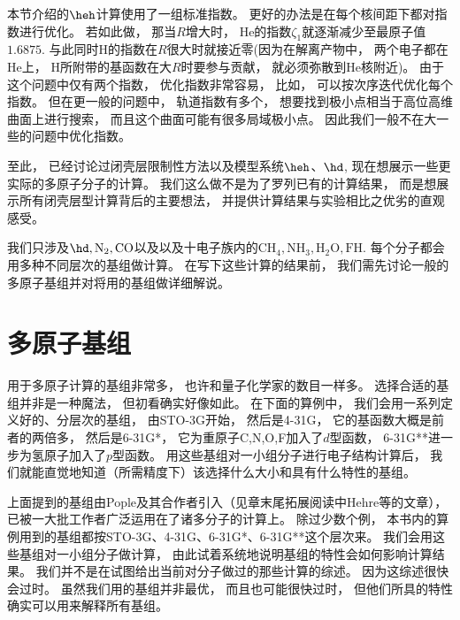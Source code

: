 
本节介绍的$\heh$计算使用了一组标准指数。
更好的办法是在每个核间距下都对指数进行优化。
若如此做，
那当$R$增大时，
$\text{He}$的指数$\zeta_1$就逐渐减少至最原子值$1.6875$. 
与此同时$\text{H}$的指数在$R$很大时就接近零(因为在解离产物中，
两个电子都在$\text{He}$上，
$\text{H}$所附带的基函数在大$R$时要参与贡献，
就必须弥散到$\text{He}$核附近)。
由于这个问题中仅有两个指数，
优化指数非常容易，
比如，
可以按次序迭代优化每个指数。
但在更一般的问题中，
轨道指数有多个，
想要找到极小点相当于高位高维曲面上进行搜索，
而且这个曲面可能有很多局域极小点。
因此我们一般不在大一些的问题中优化指数。


至此，
已经讨论过闭壳层限制性\hft 方法以及模型系统$\heh$、$\hd$, 
现在想展示一些更实际的多原子分子的计算。
我们这么做不是为了罗列已有的计算结果，
而是想展示所有闭壳层\hft 型计算背后的主要想法，
并提供计算结果与实验相比之优劣的直观感受。


我们只涉及$\hd, \text{N}_2, \text{CO}$以及以及十电子族内的$\text{CH}_4, \text{NH}_3, \text{H}_2\text{O}, \text{FH}$.
每个分子都会用多种不同层次的基组做计算。
在写下这些计算的结果前，
我们需先讨论一般的多原子基组并对将用的基组做详细解说。


\section{多原子基组}
\label{sec:3.6}
用于多原子计算的基组非常多，
也许和量子化学家的数目一样多。
选择合适的基组并非是一种魔法，
但初看确实好像如此。
在下面的算例中，
我们会用一系列定义好的、分层次的基组，
由STO-3G开始，
然后是4-31G，
它的基函数大概是前者的两倍多，
然后是6-31G*，
它为重原子C,N,O,F加入了$d$型函数，
6-31G**进一步为氢原子加入了$p$型函数。
用这些基组对一小组分子进行电子结构计算后，
我们就能直觉地知道（所需精度下）该选择什么大小和具有什么特性的基组。


上面提到的基组由Pople及其合作者引入（见章末尾拓展阅读中Hehre等的文章），
已被一大批工作者广泛运用在了诸多分子的计算上。
除过少数个例，
本书内的算例用到的基组都按STO-3G、4-31G、6-31G*、6-31G**这个层次来。
我们会用这些基组对一小组分子做计算，
由此试着系统地说明基组的特性会如何影响计算结果。
我们并不是在试图给出当前对分子做过的那些计算的综述。
因为这综述很快会过时。
虽然我们用的基组并非最优，
而且也可能很快过时，
但他们所具的特性确实可以用来解释所有基组。


